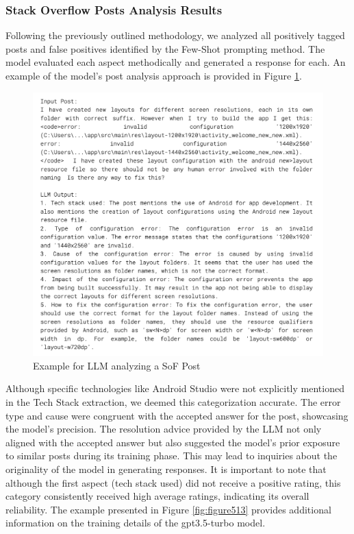 \documentclass[english,bachelor]{swsLeipzig}
\begin{document}
\subsubsection{Stack Overflow Posts Analysis Results}

Following the previously outlined methodology, we analyzed all positively tagged posts and false positives identified by the Few-Shot prompting method. The model evaluated each aspect methodically and generated a response for each. An example of the model's post analysis approach is provided in Figure \ref{fig:figure512}.

\begin{figure}[h]
  \centering
  \includegraphics[width=1\textwidth]{images/analysisres.png}
  \caption{Example for LLM analyzing a SoF Post}
  \label{fig:figure512}
\end{figure}

Although specific technologies like Android Studio were not explicitly mentioned in the Tech Stack 
extraction, we deemed this categorization accurate. The error type and cause were congruent with the accepted answer for the post, showcasing the model's precision. The resolution advice provided by the LLM not only aligned with the accepted answer but also suggested the model's prior exposure to similar posts during its training phase. This may lead to inquiries about the originality of the model in generating responses. It is important to note that although the first aspect (tech stack used) did not receive a positive rating, this category consistently received high average ratings, indicating its overall reliability. The example presented in Figure \ref{fig:figure513} provides additional information on the training details of the gpt3.5-turbo model.
\end{document}
